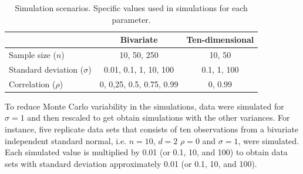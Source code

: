 \documentclass[12pt]{article}
\newcommand{\matt}[1]{\textcolor{red}{(matt: #1)}}
\begin{document}

\begin{table}[htbp]
   \centering
   \caption{Simulation scenarios. Specific values used in simulations for each parameter. \label{scen}} 
     \begin{tabular}{lcc} \hline
          &  Bivariate    & Ten-dimensional  \\ \hline
      Sample size   ($n$)   & 10, 50, 250   &  10, 50  \\
      Standard deviation ($\sigma$)  & 0.01, 0.1, 1, 10, 100 & 0.1, 1, 100 \\
      Correlation ($\rho$)   &  0, 0,25, 0.5, 0.75, 0.99  &  0, 0.99 \\ \hline
   \end{tabular}
\end{table}

To reduce Monte Carlo variability in the simulations, data were simulated for $\sigma=1$ and then rescaled to get obtain simulations with the other variances. For instance, five replicate data sets that consists of ten observations from a bivariate independent standard normal, i.e. $n=10$, $d=2$ $\rho=0$ and $\sigma=1$, were simulated. Each simulated value is multiplied by 0.01 (or 0.1, 10, and 100) to obtain data sets with standard deviation approximately 0.01 (or 0.1, 10, and 100).
\end{document}
